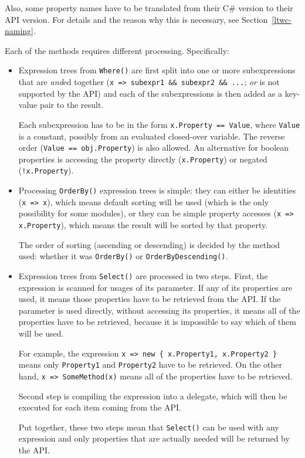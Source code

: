 Also, some property names have to be translated from their C\# version to their \ac{API} version.
For details and the reason why this is necessary, see Section~\ref{ltwc-naming}.

\medskip

Each of the methods requires different processing. Specifically:

\begin{itemize}
\item Expression trees from \lstinline{Where()} are first split into one or more subexpressions
that are \emph{and}ed together (\lstinline{x => subexpr1 && subexpr2 && ...}; \emph{or} is not supported by the \ac{API})
and each of the subexpressions is then added as a key-value pair to the result.

Each subexpression has to be in the form \lstinline{x.Property == Value},
where \lstinline{Value} is a constant, possibly from an evaluated closed-over variable.
The reverse order (\lstinline{Value == obj.Property}) is also allowed.
An alternative for boolean properties is accessing the property directly (\lstinline{x.Property})
or negated (\lstinline{!x.Property}).

\item Processing \lstinline{OrderBy()} expression trees is simple:
they can either be identities (\lstinline{x => x}), which means default sorting will be used
(which is the only possibility for some modules),
or they can be simple property accesses (\lstinline{x => x.Property}),
which means the result will be sorted by that property.

The order of sorting (ascending or descending) is decided by the method used:
whether it was \lstinline{OrderBy()} or \lstinline{OrderByDescending()}.

\item Expression trees from \lstinline{Select()} are processed in two steps.
First, the expression is scanned for usages of its parameter.
If any of its properties are used, it means those properties have to be retrieved from the \ac{API}.
If the parameter is used directly, without accessing its properties,
it means all of the properties have to be retrieved, because it is impossible to say which of them will be used.

For example, the expression \lstinline|x => new { x.Property1, x.Property2 }|
means only \lstinline{Property1} and \lstinline{Property2} have to be retrieved.
On the other hand, \lstinline{x => SomeMethod(x)} means all of the properties have to be retrieved.

Second step is compiling the expression into a delegate,
which will then be executed for each item coming from the \ac{API}.

Put together, these two steps mean that \lstinline{Select()} can be used with any expression
and only properties that are actually needed will be returned by the \ac{API}.
\end{itemize}


